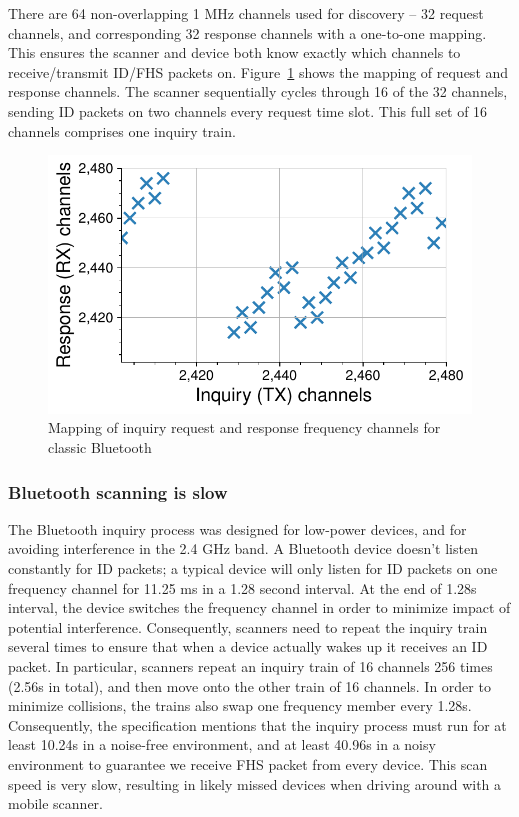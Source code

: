 There are 64 non-overlapping 1 MHz channels used for discovery -- 32 request channels, and corresponding 32 response channels with a one-to-one mapping.
%
This ensures the scanner and device both know exactly which channels to receive/transmit ID/FHS packets on.
%
Figure~\ref{fig:hyperscanner:inq_resp_map} shows the mapping of request and response channels.
%
The scanner sequentially cycles through 16 of the 32 channels, sending ID packets on two channels every request time slot.
%
This full set of 16 channels comprises one inquiry train.
%
\begin{figure}
    \centering
    \captionsetup{justification=centering}
    \includegraphics[width=0.6\linewidth]{hyperscanner/plots/inq_resp_map.pdf}
    \caption{Mapping of inquiry request and response frequency channels for classic Bluetooth}
    \label{fig:hyperscanner:inq_resp_map}
\end{figure}



\subsubsection*{Bluetooth scanning is slow}
The Bluetooth inquiry process was designed for low-power devices, and for avoiding interference in the 2.4 GHz band.
%
A Bluetooth device doesn't listen constantly for ID packets; a typical device will only listen for ID packets on one frequency channel for 11.25 ms in a 1.28 second interval.
%
At the end of 1.28s interval, the device switches the frequency channel in order to minimize impact of potential interference.
%
Consequently, scanners need to repeat the inquiry train several times to ensure that when a device actually wakes up it receives an ID packet.
%
In particular, scanners repeat an inquiry train of 16 channels 256 times (2.56s in total), and then move onto the other train of 16 channels.
%
In order to minimize collisions, the trains also swap one frequency member every 1.28s.
%
Consequently, the specification mentions that the inquiry process must run for at least 10.24s in a noise-free environment, and at least 40.96s in a noisy environment to guarantee we receive FHS packet from every device.
%
This scan speed is very slow, resulting in likely missed devices when driving around with a mobile scanner.



